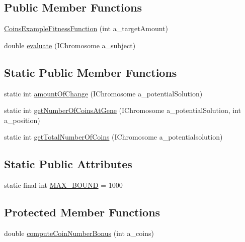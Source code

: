 \subsection*{Public Member Functions}
\begin{DoxyCompactItemize}
\item 
\hyperlink{classexamples_1_1audit_1_1_coins_example_fitness_function_ab5d9ed7b6212098bf6a810d2f601d43d}{Coins\-Example\-Fitness\-Function} (int a\-\_\-target\-Amount)
\item 
double \hyperlink{classexamples_1_1audit_1_1_coins_example_fitness_function_aed089c3cf48df47309416160e1746d7f}{evaluate} (I\-Chromosome a\-\_\-subject)
\end{DoxyCompactItemize}
\subsection*{Static Public Member Functions}
\begin{DoxyCompactItemize}
\item 
static int \hyperlink{classexamples_1_1audit_1_1_coins_example_fitness_function_a27bfff7299c88e40420530d963f0c047}{amount\-Of\-Change} (I\-Chromosome a\-\_\-potential\-Solution)
\item 
static int \hyperlink{classexamples_1_1audit_1_1_coins_example_fitness_function_a9ba197bfba22c3d7d510dc83aa8a4e0e}{get\-Number\-Of\-Coins\-At\-Gene} (I\-Chromosome a\-\_\-potential\-Solution, int a\-\_\-position)
\item 
static int \hyperlink{classexamples_1_1audit_1_1_coins_example_fitness_function_a6737f37061b5800e64fea85f29c69471}{get\-Total\-Number\-Of\-Coins} (I\-Chromosome a\-\_\-potentialsolution)
\end{DoxyCompactItemize}
\subsection*{Static Public Attributes}
\begin{DoxyCompactItemize}
\item 
static final int \hyperlink{classexamples_1_1audit_1_1_coins_example_fitness_function_a8cef507218435b4d205761e8f3ed4341}{M\-A\-X\-\_\-\-B\-O\-U\-N\-D} = 1000
\end{DoxyCompactItemize}
\subsection*{Protected Member Functions}
\begin{DoxyCompactItemize}
\item 
double \hyperlink{classexamples_1_1audit_1_1_coins_example_fitness_function_a1f5dd049791f0ec71fa9f380ccdafa1d}{compute\-Coin\-Number\-Bonus} (int a\-\_\-coins)
\end{DoxyCompactItemize}
